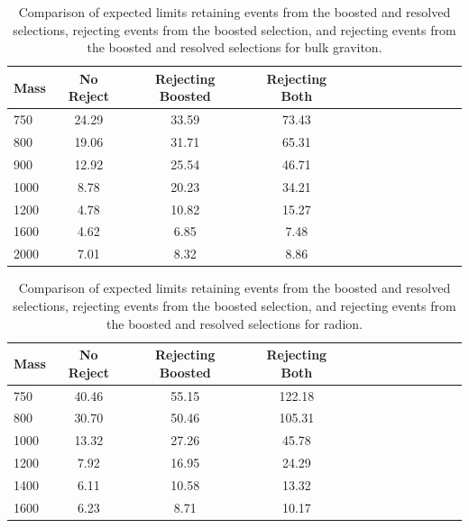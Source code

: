 \begin{table}[h]
\begin{tabular}{|l|c|c|c|c|c|c|c|c|c|c|c|c|}
\hline
Mass & No Reject & Rejecting Boosted & Rejecting Both \\ \hline
750 & 24.29 & 33.59 & 73.43\\
800 & 19.06 & 31.71 & 65.31\\
900 & 12.92 & 25.54 & 46.71\\
1000 & 8.78 & 20.23 & 34.21\\
1200 & 4.78 & 10.82 & 15.27\\
1600 & 4.62 & 6.85 & 7.48\\
2000 & 7.01 & 8.32 & 8.86\\
\hline
\end{tabular}
\caption{Comparison of expected limits retaining events from the boosted and resolved selections, rejecting events from the boosted selection, and rejecting events from the boosted and resolved selections for bulk graviton.}\label{tab:comblimBG}
\end{table}

\begin{table}[h]
\begin{tabular}{|l|c|c|c|c|c|c|c|c|c|c|c|c|}
\hline
Mass & No Reject & Rejecting Boosted & Rejecting Both \\ \hline
750 & 40.46 & 55.15 & 122.18\\
800 & 30.70 & 50.46 & 105.31\\
1000 & 13.32 & 27.26 & 45.78\\
1200 & 7.92 & 16.95 & 24.29\\
1400 & 6.11 & 10.58 & 13.32\\
1600 & 6.23 & 8.71 & 10.17\\
\hline
\end{tabular}
\caption{Comparison of expected limits retaining events from the boosted and resolved selections, rejecting events from the boosted selection, and rejecting events from the boosted and resolved selections for radion.}\label{tab:comblimRad}
\end{table}

